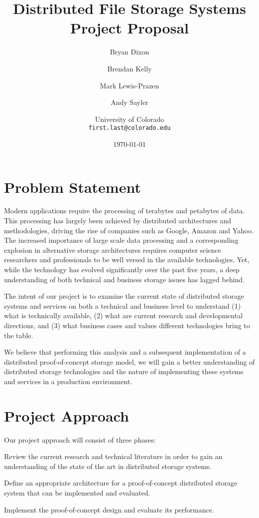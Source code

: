 \documentclass[11pt]{article}
\newenvironment{packed_enum}{
\begin{enumerate}
  \setlength{\itemsep}{1pt}
  \setlength{\parskip}{0pt}
  \setlength{\parsep}{0pt}
}{\end{enumerate}}
\begin{document}
\title{
  Distributed File Storage Systems\\
  Project Proposal
}
\author{
  Bryan Dixon \and Brendan Kelly \and Mark Lewis-Prazen \and Andy Sayler\\
  \and University of Colorado\\
  \texttt{first.last@colorado.edu}
}
\date{\today}

\maketitle

\newpage

\section{Problem Statement}
Modern applications require the
processing of terabytes and petabytes of data. This processing has
largely been achieved by distributed architectures and
methodologies, driving the rise of companies such as Google, Amazon
and Yahoo. The increased importance of large scale data processing and a
corresponding explosion in alternative storage architectures
requires computer science researchers and
professionals to be well versed in the available technologies.
Yet, while the technology has evolved
significantly over the past five years, a deep understanding of both
technical and business storage issues has lagged behind.

The intent of our project is to examine the current state of distributed
storage systems and services on both a
technical and business level to understand
(1) what is technically available,
(2) what are current research and developmental directions,
and (3) what business cases and values different technologies bring to
the table.

We believe that performing this analysis and a subsequent implementation of
a distributed proof-of-concept storage model, we will gain a better
understanding of distributed storage technologies and the nature
of implementing these systems and services in a production environment.

\section{Project Approach}
Our project approach will consist of three phases:
\begin{packed_enum}
\item Review the current research and technical literature
  in order to gain an understanding of the state of the art in
  distributed storage systems.
\item Define an appropriate architecture for a proof-of-concept
  distributed storage system that can be implemented and evaluated.
\item Implement the proof-of-concept design and evaluate its performance.
\end{packed_enum}
\end{document}
